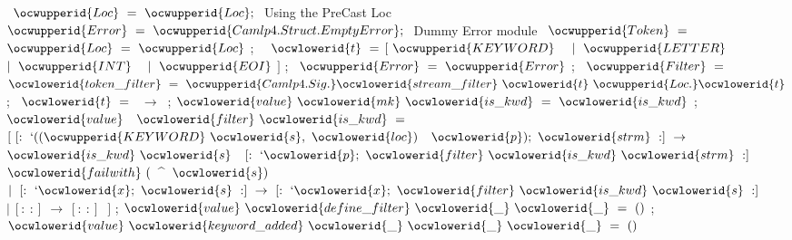 \documentclass[12pt]{article}
\begin{document}
\label{../ML/zen_lexer.ml:878}%
\ocwindent{1.00em}
~$\ocwupperid{Loc}~=~\ocwupperid{Loc};~$\ocwbc{} Using the PreCast Loc \ocwec{}\ocweol
\ocwindent{1.00em}
~$\ocwupperid{Error}~=~\ocwupperid{Camlp4.Struct.EmptyError};~$\ocwbc{} Dummy Error module \ocwec{}\ocweol
\ocwindent{1.00em}
~$\ocwupperid{Token}~=~$\ocweol
\ocwindent{2.00em}
~$\ocwupperid{Loc}~=~\ocwupperid{Loc}$\ocweol
\ocwindent{2.00em}
;~\ocweol
\ocwindent{2.00em}
~$\ocwlowerid{t}~=$\ocweol
\ocwindent{3.00em}
$[~\ocwupperid{KEYWORD}~$~\ocweol
\ocwindent{3.00em}
$\mid{}~\ocwupperid{LETTER}~$~~\ocweol
\ocwindent{3.00em}
$\mid{}~\ocwupperid{INT}~$~\ocweol
\ocwindent{3.00em}
$\mid{}~\ocwupperid{EOI}$\ocweol
\ocwindent{3.00em}
$]$\ocweol
\ocwindent{2.00em}
;\ocweol
\ocwindent{2.00em}
~$\ocwupperid{Error}~=~\ocwupperid{Error}$\ocweol
\ocwindent{2.00em}
;\ocweol
\ocwindent{2.00em}
~$\ocwupperid{Filter}~=~$\ocweol
\ocwindent{3.00em}
~$\ocwlowerid{token\_filter}~=~\ocwupperid{Camlp4.Sig.}\ocwlowerid{stream\_filter}~\ocwlowerid{t}~\ocwupperid{Loc.}\ocwlowerid{t}$\ocweol
\ocwindent{3.00em}
;\ocweol
\ocwindent{3.00em}
~$\ocwlowerid{t}~=~$~$\rightarrow{}~$\ocweol
\ocwindent{3.00em}
;\ocweol
\ocwindent{3.00em}
$\ocwlowerid{value}~\ocwlowerid{mk}~\ocwlowerid{is\_kwd}~=~\ocwlowerid{is\_kwd}$\ocweol
\ocwindent{3.00em}
;\ocweol
\ocwindent{3.00em}
$\ocwlowerid{value}~$~$\ocwlowerid{filter}~\ocwlowerid{is\_kwd}~=~$\ocweol
\ocwindent{4.00em}
$[~[:~`((\ocwupperid{KEYWORD}~\ocwlowerid{s},~\ocwlowerid{loc})~$~$\ocwlowerid{p});~\ocwlowerid{strm}~:]~\rightarrow{}$\ocweol
\ocwindent{6.50em}
~$\ocwlowerid{is\_kwd}~\ocwlowerid{s}~$~$[:~`\ocwlowerid{p};~\ocwlowerid{filter}~\ocwlowerid{is\_kwd}~\ocwlowerid{strm}~:]$\ocweol
\ocwindent{6.50em}
~$\ocwlowerid{failwith}~($~\^{}~$\ocwlowerid{s})~$\ocweol
\ocwindent{4.00em}
$\mid{}~[:~`\ocwlowerid{x};~\ocwlowerid{s}~:]~\rightarrow{}~[:~`\ocwlowerid{x};~\ocwlowerid{filter}~\ocwlowerid{is\_kwd}~\ocwlowerid{s}~:]$\ocweol
\ocwindent{4.00em}
$\mid{}~[:~:]~\rightarrow{}~[:~:]~$\ocweol
\ocwindent{4.00em}
$]$\ocweol
\ocwindent{3.00em}
;\ocweol
\ocwindent{3.00em}
$\ocwlowerid{value}~\ocwlowerid{define\_filter}~\ocwlowerid{\_}~\ocwlowerid{\_}~=~()$\ocweol
\ocwindent{3.00em}
;\ocweol
\ocwindent{3.00em}
$\ocwlowerid{value}~\ocwlowerid{keyword\_added}~\ocwlowerid{\_}~\ocwlowerid{\_}~\ocwlowerid{\_}~=~()$\ocweol
\end{document}
